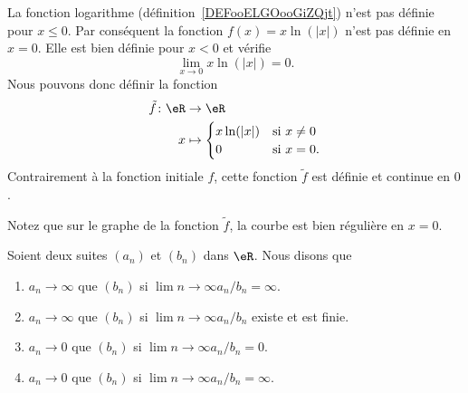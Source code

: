 \begin{example}     \label{EXooAGEOooQdQkrS}
	La fonction logarithme (définition~\ref{DEFooELGOooGiZQjt}) n'est pas définie pour \( x\leq 0\). Par conséquent la fonction \( f(x)=x\ln(|x|)\) n'est pas définie en \( x=0\). Elle est bien définie pour \( x<0\) et vérifie
	\begin{equation}
		\lim_{x\to 0} x\ln(|x|)=0.
	\end{equation}
	Nous pouvons donc définir la fonction
	\begin{equation}
		\begin{aligned}
			\tilde f\colon \eR & \to \eR                                  \\
			x                  & \mapsto \begin{cases}
				                             x\ln(| x |) & \text{si } x\neq 0 \\
				                             0           & \text{si } x=0.
			                             \end{cases}
		\end{aligned}
	\end{equation}
	Contrairement à la fonction initiale \( f\), cette fonction \( \tilde f\) est définie et continue en \( 0\).

	Notez que sur le graphe de la fonction \( \tilde f\), la courbe est bien régulière en \( x=0\).
	\begin{center}
		
	\end{center}
\end{example}


\begin{definition}			\label{DEFooFJZXooIVrzvk}
	Soient deux suites \( (a_n)\) et \( (b_n)\) dans \( \eR\). Nous disons que
	\begin{enumerate}
		\item
		      \( a_n\to \infty\)  que \( (b_n)\) si \( \lim{n\to\infty }a_n/b_n=\infty\).
		\item
		      \( a_n\to \infty\)  que \( (b_n)\) si \( \lim{n\to\infty }a_n/b_n\) existe et est finie.
		\item
		      \( a_n\to 0\)  que \( (b_n)\) si \( \lim{n\to\infty }a_n/b_n=0\).
		\item
		      \( a_n\to 0\)  que \( (b_n)\) si \( \lim{n\to\infty }a_n/b_n=\infty\).
	\end{enumerate}
\end{definition}

